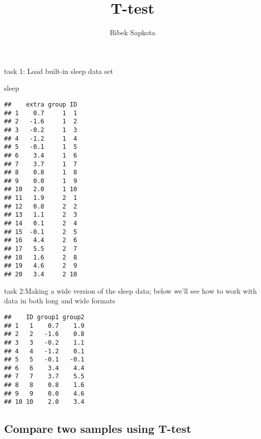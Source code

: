 \documentclass[
]{article}
\title{T-test}
\author{Bibek Sapkota}
\date{}
\newenvironment{Shaded}{\begin{snugshade}}{\end{snugshade}}
\newcommand{\AttributeTok}[1]{\textcolor[rgb]{0.13,0.29,0.53}{#1}}
\newcommand{\DecValTok}[1]{\textcolor[rgb]{0.00,0.00,0.81}{#1}}
\newcommand{\FunctionTok}[1]{\textcolor[rgb]{0.13,0.29,0.53}{\textbf{#1}}}
\newcommand{\NormalTok}[1]{#1}
\newcommand{\OtherTok}[1]{\textcolor[rgb]{0.56,0.35,0.01}{#1}}
\newcommand{\SpecialCharTok}[1]{\textcolor[rgb]{0.81,0.36,0.00}{\textbf{#1}}}
\begin{document}
\maketitle

task 1: Load built-in sleep data set

\begin{Shaded}
\begin{Highlighting}[]
\NormalTok{sleep}
\end{Highlighting}
\end{Shaded}

\begin{verbatim}
##    extra group ID
## 1    0.7     1  1
## 2   -1.6     1  2
## 3   -0.2     1  3
## 4   -1.2     1  4
## 5   -0.1     1  5
## 6    3.4     1  6
## 7    3.7     1  7
## 8    0.8     1  8
## 9    0.0     1  9
## 10   2.0     1 10
## 11   1.9     2  1
## 12   0.8     2  2
## 13   1.1     2  3
## 14   0.1     2  4
## 15  -0.1     2  5
## 16   4.4     2  6
## 17   5.5     2  7
## 18   1.6     2  8
## 19   4.6     2  9
## 20   3.4     2 10
\end{verbatim}

task 2:Making a wide version of the sleep data; below we'll see how to
work with data in both long and wide formats

\begin{Shaded}
\end{Shaded}

\begin{verbatim}
##    ID group1 group2
## 1   1    0.7    1.9
## 2   2   -1.6    0.8
## 3   3   -0.2    1.1
## 4   4   -1.2    0.1
## 5   5   -0.1   -0.1
## 6   6    3.4    4.4
## 7   7    3.7    5.5
## 8   8    0.8    1.6
## 9   9    0.0    4.6
## 10 10    2.0    3.4
\end{verbatim}

\hypertarget{compare-two-samples-using-t-test}{%
\subsection{Compare two samples using
T-test}\label{compare-two-samples-using-t-test}}
\end{document}
